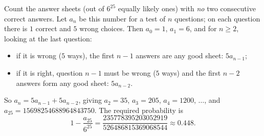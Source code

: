 Count the answer sheets (out of $6^{25}$ equally likely ones) with \emph{no} two consecutive correct answers. Let $a_n$ be this number for a test of $n$ questions; on each question there is $1$ correct and $5$ wrong choices. Then $a_0=1$, $a_1=6$, and for $n\ge2$, looking at the last question:
\begin{itemize}
\item if it is wrong ($5$ ways), the first $n-1$ answers are any good sheet: $5a_{n-1}$;
\item if it is right, question $n-1$ must be wrong ($5$ ways) and the first $n-2$ answers form any good sheet: $5a_{n-2}$.
\end{itemize}
So $a_n=5a_{n-1}+5a_{n-2}$, giving $a_2=35$, $a_3=205$, $a_4=1200$, $\dots$, and $a_{25}=15698254688964843750$. The required probability is
\[1-\dfrac{a_{25}}{6^{25}}=\boxed{\dfrac{235778395203052919}{526486815369068544}}\approx0.448.\]
